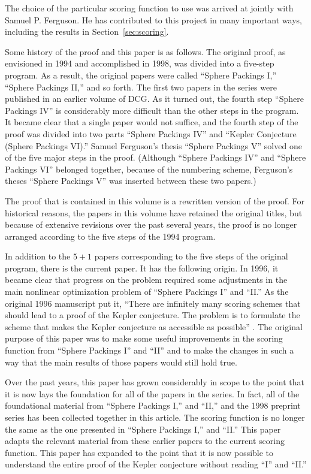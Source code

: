 The choice of the particular scoring function to use was arrived at
jointly with Samuel P. Ferguson.  He has contributed to this project
in many important ways, including the results in
Section~\ref{sec:scoring}.

\smallskip

Some history of the proof and this paper is as follows.  The
original proof, as envisioned in 1994 and accomplished in 1998, was
divided into a five-step program. As a result, the original papers
were called ``Sphere Packings I,'' ``Sphere Packings II,'' and so
forth. The first two papers in the series were published in an
earlier volume of DCG. As it turned out, the fourth step ``Sphere
Packings IV'' is considerably more difficult than the other steps in
the program. It became clear that a single paper would not suffice,
and the fourth step of the proof was divided into two parts ``Sphere
Packings IV'' and ``Kepler Conjecture (Sphere Packings VI).'' Samuel
Ferguson's thesis ``Sphere Packings V'' solved one of the five major
steps in the proof. (Although ``Sphere Packings IV'' and ``Sphere
Packings VI'' belonged together, because of the numbering scheme,
Ferguson's theses ``Sphere Packings V'' was inserted between these
two papers.)

The proof that is contained in this volume is a rewritten version of
the proof. For historical reasons, the papers in this volume have
retained the original titles, but because of extensive revisions
over the past several years, the proof is no longer arranged
according to the five steps of the 1994 program.

In addition to the $5+1$ papers corresponding to the five steps of
the original program, there is the current paper. It has the
following origin.  In 1996, it became clear that progress on the
problem required some adjustments in the main nonlinear optimization
problem of ``Sphere Packings I'' and ``II.''  As the original 1996
manuscript put it, ``There are infinitely many scoring schemes that
should lead to a proof of the Kepler conjecture.  The problem is to
formulate the scheme that makes the Kepler conjecture as accessible
as possible'' \cite{reform}.
The original purpose of this paper was to make some useful
improvements in the scoring function from ``Sphere Packings I'' and
``II'' and to make the changes in such a way that the main results
of those papers would still hold true.

Over the past years, this paper has grown considerably in scope to
the point that it is now lays the foundation for all of the papers
in the series.  In fact, all of the foundational material from
``Sphere Packings I,'' and ``II,'' and the 1998 preprint series has
been collected together in this article.  The scoring function is no
longer the same as the one presented in ``Sphere Packings I,'' and
``II.''  This paper adapts the relevant material from these earlier
papers to the current scoring function.   This paper has expanded to
the point that it is now possible to understand the entire proof of
the Kepler conjecture without reading ``I'' and ``II.''
